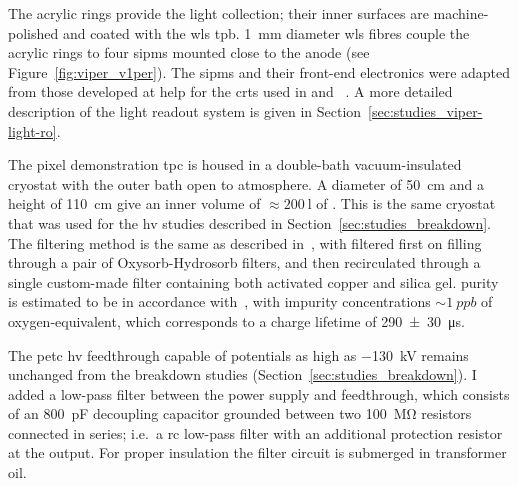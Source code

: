 The acrylic rings provide the light collection; their inner surfaces are machine-polished and coated with the \gls{wls} \gls{tpb}. 
\SI{1}{\milli\metre} diameter \gls{wls} fibres couple the acrylic rings to four \glspl{sipm} mounted close to the anode (see Figure~\ref{fig:viper_v1per}). 
The \glspl{sipm} and their front-end electronics were adapted from those developed at \gls{help} for the \glspl{crt} used in \uboone{} and \sbnd{}~\cite{crt, crt_feb}.
A more detailed description of the light readout system is given in Section~\ref{sec:studies_viper-light-ro}.

The pixel demonstration \gls{tpc} is housed in a double-bath vacuum-insulated cryostat with the outer bath open to atmosphere.
A diameter of \SI{50}{\centi\metre} and a height of \SI{110}{\centi\metre} give an inner volume of $\approx \SI{200}{\litre}$ of \lar{}.
This is the same cryostat that was used for the \gls{hv} studies described in Section~\ref{sec:studies_breakdown}.
The \lar{} filtering method is the same as described in~\cite{2photonAbs}, with \lar{} filtered first on filling through a pair of Oxysorb-Hydrosorb filters, and then recirculated through a single custom-made filter containing both activated copper and silica gel.
\lar{} purity is estimated to be in accordance with~\cite{2photonAbs}, with impurity concentrations $\sim{\SI{1}{ppb}}$ of oxygen-equivalent, which corresponds to a charge lifetime of \SI{290+-30}{\micro\second}.

The \gls{petc} \gls{hv} feedthrough capable of potentials as high as \SI{-130}{\kilo\volt} remains unchanged from the breakdown studies (Section~\ref{sec:studies_breakdown}).
I added a low-pass filter between the power supply and feedthrough, which consists of an \SI{800}{\pico\farad} decoupling capacitor grounded between two \SI{100}{\mega\ohm} resistors connected in series; i.e.\ a \gls{rc} low-pass filter with an additional protection resistor at the output.
For proper insulation the filter circuit is submerged in transformer oil.

